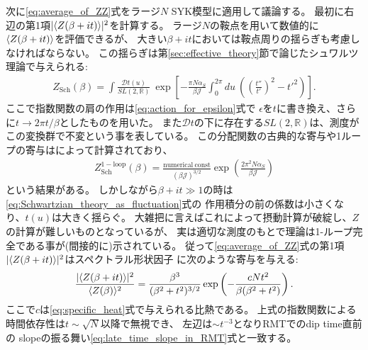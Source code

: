 次に\eqref{eq:average_of_ZZ}式をラージ$N$ SYK模型に適用して議論する。
最初に右辺の第1項$|\langle Z(\beta + it) \rangle|^2$を計算する。
ラージ$N$の鞍点を用いて数値的に$\langle Z(\beta + it) \rangle$を評価できるが、
大きい$\beta + it$においては鞍点周りの揺らぎも考慮しなければならない。
この揺らぎは第\ref{sec:effective_theory}節で論じたシュワルツ理論で与えられる:
\begin{align}
	Z_{\mathrm{Sch}}(\beta)
	= \int \frac{\mathcal{D}t(u)}{SL(2, \mathbb{R})}\ 
		\exp\left[
			-\frac{\pi N\alpha_S}{\beta\mathcal{J}}\int_0^{2\pi}du\ 
			\left(\left(\frac{t''}{t'}\right)^2 - t'^2\right)		
		\right].
	\label{eq:Schwartzian_theory_as_fluctuation}
\end{align}
ここで指数関数の肩の作用は\eqref{eq:action_for_epsilon}式で
$\epsilon$を$t$に書き換え、さらに$t\to 2\pi t/\beta$としたものを用いた。
また$\mathcal{D}t$の下に存在する$SL(2,\mathbb{R})$は、測度がこの変換群で不変という事を表している。
この分配関数の古典的な寄与や1ループの寄与は\cite{maldacena}によって計算されており、
\begin{align}
	Z_{\mathrm{Sch}}^{\mathrm{1-loop}}(\beta)
	= \frac{\mathrm{numerical\ const}}{(\beta \mathcal{J})^{3/2}}
		\exp\left(\frac{2\pi^2N\alpha_S}{\beta\mathcal{J}}\right)
	\label{eq:one_loop_Schwartzian}
\end{align}
という結果がある。
しかしながら$\beta + it\gg 1$の時は\eqref{eq:Schwartzian_theory_as_fluctuation}式の
作用積分の前の係数は小さくなり、$t(u)$は大きく揺らぐ。
大雑把に言えばこれによって摂動計算が破綻し、$Z$の計算が難しいものとなっているが、
実は適切な測度のもとで理論は1-ループ完全である事が(間接的に)示されている\cite{polchinski_chaos}。
従って\eqref{eq:average_of_ZZ}式の第1項$|\langle Z(\beta + it) \rangle|^2$はスペクトラル形状因子
に次のような寄与を与える:
\begin{align}
	\frac{|\langle Z(\beta + it) \rangle|^2}{\langle Z(\beta) \rangle^2}
	= \frac{\beta^3}{(\beta^2 + t^2)^{3/2}}\exp\left(
		-\frac{cNt^2}{\beta(\beta^2 + t^2)}	
	\right).
	\label{eq:slope_in_SYK}
\end{align}
ここで$c$は\eqref{eq:specific_heat}式で与えられる比熱である。
上式の指数関数による時間依存性は$t\sim \sqrt{N}$以降で無視でき、
左辺は$\sim t^{-3}$となりRMTでのdip time直前の
slopeの振る舞い\eqref{eq:late_time_slope_in_RMT}式と一致する。

